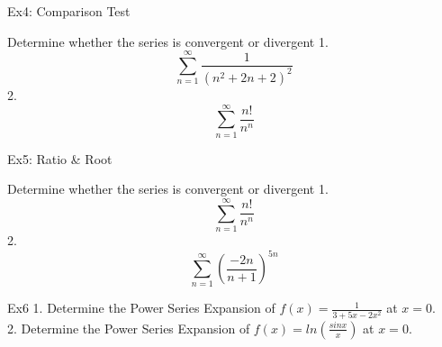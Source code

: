 \begin{frame}{Ex4: Comparison Test}
    \begin{block}{Determine whether the series is convergent or divergent}
        1.$$\sum\limits_{n=1}^{\infty} \frac{1}{(n^2+2n+2)^2}$$
        2.$$\sum\limits_{n=1}^{\infty} \frac{n!}{n^n}$$
    \end{block}
\end{frame}


\begin{frame}{Ex5: Ratio \& Root}
    \begin{block}{Determine whether the series is convergent or divergent}
        1.$$\sum\limits_{n=1}^{\infty} \frac{n!}{n^n}$$
        2.$$\sum\limits_{n=1}^{\infty} (\frac{-2n}{n+1})^{5n}$$
    \end{block}
\end{frame}


\begin{frame}{Ex6}
    1. Determine the Power Series Expansion of $f (x) = \frac{1}{3+5x-2x^2}$
    at $x = 0$.\\
    2. Determine the Power Series Expansion of $f (x) = ln (\frac{sinx}{x})$
    at $x = 0$.
\end{frame}